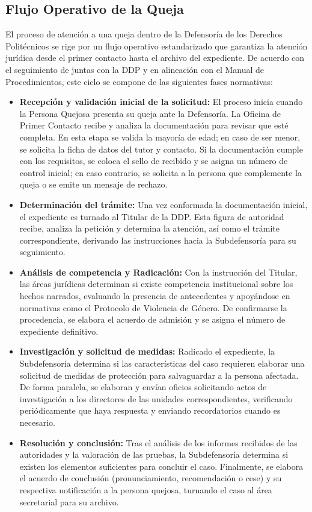 \subsection{Flujo Operativo de la Queja}
El proceso de atención a una queja dentro de la Defensoría de los Derechos Politécnicos se rige por un flujo operativo estandarizado que garantiza la atención jurídica desde el primer contacto hasta el archivo del expediente. De acuerdo con el seguimiento de juntas con la DDP y en alineación con el Manual de Procedimientos, este ciclo se compone de las siguientes fases normativas:

\begin{itemize}
    \item \textbf{Recepción y validación inicial de la solicitud:} El proceso inicia cuando la Persona Quejosa presenta su queja ante la Defensoría. La Oficina de Primer Contacto recibe y analiza la documentación para revisar que esté completa. En esta etapa se valida la mayoría de edad; en caso de ser menor, se solicita la ficha de datos del tutor y contacto. Si la documentación cumple con los requisitos, se coloca el sello de recibido y se asigna un número de control inicial; en caso contrario, se solicita a la persona que complemente la queja o se emite un mensaje de rechazo.
    \item \textbf{Determinación del trámite:} Una vez conformada la documentación inicial, el expediente es turnado al Titular de la DDP. Esta figura de autoridad recibe, analiza la petición y determina la atención, así como el trámite correspondiente, derivando las instrucciones hacia la Subdefensoría para su seguimiento.
    \item \textbf{Análisis de competencia y Radicación:} Con la instrucción del Titular, las áreas jurídicas determinan si existe competencia institucional sobre los hechos narrados, evaluando la presencia de antecedentes y apoyándose en normativas como el Protocolo de Violencia de Género. De confirmarse la procedencia, se elabora el acuerdo de admisión y se asigna el número de expediente definitivo.
    \item \textbf{Investigación y solicitud de medidas:} Radicado el expediente, la Subdefensoría determina si las características del caso requieren elaborar una solicitud de medidas de protección para salvaguardar a la persona afectada. De forma paralela, se elaboran y envían oficios solicitando actos de investigación a los directores de las unidades correspondientes, verificando periódicamente que haya respuesta y enviando recordatorios cuando es necesario.
    \item \textbf{Resolución y conclusión:} Tras el análisis de los informes recibidos de las autoridades y la valoración de las pruebas, la Subdefensoría determina si existen los elementos suficientes para concluir el caso. Finalmente, se elabora el acuerdo de conclusión (pronunciamiento, recomendación o cese) y su respectiva notificación a la persona quejosa, turnando el caso al área secretarial para su archivo.
\end{itemize}

